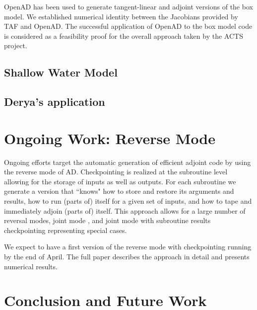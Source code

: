 \documentclass[acmtocl,acmnow]{acmtrans2m}
\begin{document}
OpenAD has been used to generate tangent-linear and 
adjoint versions of the box model. We established numerical identity between
the Jacobians provided by TAF and OpenAD.
The successful 
application of OpenAD to the box model code is considered as a feasibility 
proof for the overall approach taken by the ACTS project.  
\subsection{Shallow Water Model}
\subsection{Derya's application}

\section*{Ongoing Work: Reverse Mode}

Ongoing efforts target the automatic generation of efficient adjoint
code by using the reverse mode of AD. Checkpointing is realized at the 
subroutine level allowing for the storage of inputs as well as outputs. 
For each subroutine we generate a version that ``knows" how to store and 
restore its arguments and results, how to run (parts of) itself for a given
set of inputs, and how to tape and immediately adjoin (parts of) itself.
This approach allows for a large number of reversal modes, 
joint mode \cite{Gri00}, and joint mode with subroutine results checkpointing 
representing special cases. 

We expect to have a first version of the reverse mode with checkpointing
running by the end of April. The full paper describes the approach in detail 
and presents numerical results.

\section*{Conclusion and Future Work}
\end{document}
